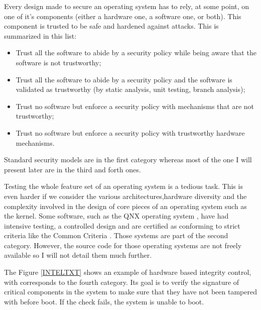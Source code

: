 \documentclass[pdftex,a4paper,titlepage,11pt]{article}
\begin{document}
Every design made to secure an operating system has to rely, at some point, on
one of it's components (either a hardware one, a software one, or both). This
component is trusted to be safe and hardened against attacks. This is
summarized in this list:

\begin{itemize}
	\item Trust all the software to abide by a security policy while being
aware that the software is not trustworthy;
	\item Trust all the software to abide by a security policy and the software
is validated as trustworthy (by static analysis, unit testing, branch analysis);
	\item Trust no software but enforce a security policy with mechanisms that
are not trustworthy;
	\item Trust no software but enforce a security policy with trustworthy
hardware mechanisms.
\end{itemize}

\smallskip

Standard security models are in the first category whereas most of the one I
will present later are in the third and forth ones.

\bigskip

Testing the whole feature set of an operating system is a tedious task. This is
even harder if we consider the various architectures,hardware diversity and the
complexity involved in the design of core pieces of an operating system such as
the kernel. Some software, such as the QNX operating system
\cite{qnxoperatingsystem}, have had
intensive testing, a controlled design and are certified as conforming to
strict criteria like the Common Criteria \cite{commoncriteria}. Those systems
are part
of the
second category. However, the source code for those operating systems are not
freely available so I will not detail them much further.

\bigskip

The Figure \ref{INTELTXT} \cite{inteltxt} shows an example of hardware based
integrity control,
with corresponds to the fourth category. Its goal is to verify the signature
of critical components in the system to make sure that they have not been
tampered with before boot. If the check fails, the system is unable to boot.
\end{document}
